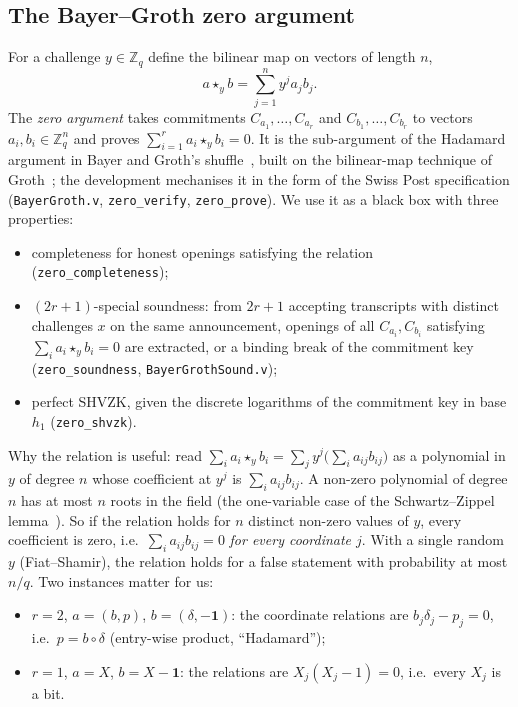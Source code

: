 \documentclass[11pt,a4paper]{article}
\newcommand{\Z}{\mathbb{Z}}
\newcommand{\rocq}[1]{\texttt{#1}}
\theoremstyle{remark}
\begin{document}
\subsection{The Bayer--Groth zero argument}\label{sec:zero}
For a challenge $y \in \Z_q$ define the bilinear map on vectors of length
$n$,
\[
  a \star_y b = \sum_{j=1}^{n} y^{j} a_j b_j .
\]
The \emph{zero argument} takes commitments $C_{a_1}, \ldots, C_{a_r}$ and
$C_{b_1}, \ldots, C_{b_r}$ to vectors $a_i, b_i \in \Z_q^n$ and proves
$\sum_{i=1}^{r} a_i \star_y b_i = 0$. It is the sub-argument of the
Hadamard argument in Bayer and Groth's shuffle~\cite{bayergroth}, built on
the bilinear-map technique of Groth~\cite{groth09}; the development mechanises
it in the form of the Swiss Post specification (\rocq{BayerGroth.v},
\rocq{zero\_verify}, \rocq{zero\_prove}). We use it as a black box with
three properties:
\begin{itemize}[nosep]
  \item completeness for honest openings satisfying the relation
  (\rocq{zero\_completeness});
  \item $(2r{+}1)$-special soundness: from $2r+1$ accepting transcripts
  with distinct challenges $x$ on the same announcement, openings of all
  $C_{a_i}, C_{b_i}$ satisfying $\sum_i a_i \star_y b_i = 0$ are
  extracted, or a binding break of the commitment key
  (\rocq{zero\_soundness}, \rocq{BayerGrothSound.v});
  \item perfect SHVZK, given the discrete logarithms of the commitment key
  in base $h_1$ (\rocq{zero\_shvzk}).
\end{itemize}
Why the relation is useful: read $\sum_i a_i \star_y b_i = \sum_j y^j
\big(\sum_i a_{ij} b_{ij}\big)$ as a polynomial in $y$ of degree $n$ whose
coefficient at $y^j$ is $\sum_i a_{ij} b_{ij}$. A non-zero polynomial of
degree $n$ has at most $n$ roots in the field (the one-variable case of
the Schwartz--Zippel lemma~\cite{schwartz,zippel}). So if the relation holds for
$n$ distinct non-zero values of $y$, every coefficient is zero, i.e.\
$\sum_i a_{ij} b_{ij} = 0$ \emph{for every coordinate $j$}. With a single
random $y$ (Fiat--Shamir), the relation holds for a false statement with
probability at most $n/q$. Two instances matter for us:
\begin{itemize}[nosep]
  \item $r = 2$, $a = (b, p)$, $b = (\delta, -\mathbf{1})$: the coordinate
  relations are $b_j \delta_j - p_j = 0$, i.e.\ $p = b \circ \delta$
  (entry-wise product, ``Hadamard'');
  \item $r = 1$, $a = X$, $b = X - \mathbf{1}$: the relations are $X_j (X_j
  - 1) = 0$, i.e.\ every $X_j$ is a bit.
\end{itemize}
\end{document}
